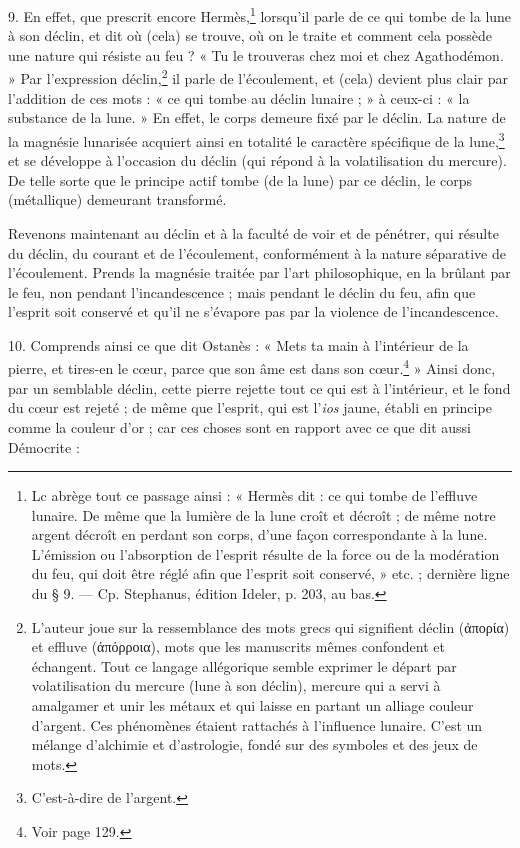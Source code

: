 \documentclass[a4paper, 11pt, oneside, polutonikogreek, french]{article}
\begin{document}
9. En effet, que prescrit encore Hermès,\footnote{Lc abrège tout ce passage ainsi : « Hermès dit : ce qui tombe de l'effluve lunaire. De même que la lumière de la lune croît et décroît ; de même notre argent décroît en perdant son corps, d'une façon correspondante à la lune. L'émission ou l'absorption de l'esprit résulte de la force ou de la modération du feu, qui doit être réglé afin que l'esprit soit conservé, » etc. ; dernière ligne du § 9. --- Cp. Stephanus, édition Ideler, p. 203, au bas.} lorsqu'il parle de ce qui tombe de la lune à son déclin, et dit où (cela) se trouve, où on le traite et comment cela possède une nature qui résiste au feu ? « Tu le trouveras chez moi et chez Agathodémon. » Par l'expression déclin,\footnote{L'auteur joue sur la ressemblance des mots grecs qui signifient déclin (ἀπορία) et effluve (ἀπόρροια), mots que les manuscrits mêmes confondent et échangent. Tout ce langage allégorique semble exprimer le départ par volatilisation du mercure (lune à son déclin), mercure qui a servi à amalgamer et unir les métaux et qui laisse en partant un alliage couleur d'argent. Ces phénomènes étaient rattachés à l'influence lunaire. C'est un mélange d'alchimie et d'astrologie, fondé sur des symboles et des jeux de mots.} il parle de l'écoulement, et (cela) devient plus clair par l'addition de ces mots : « ce qui tombe au déclin lunaire ; » à ceux-ci : « la substance de la lune. » En effet, le corps demeure fixé par le déclin. La nature de la magnésie lunarisée acquiert ainsi en totalité le caractère spécifique de la lune,\footnote{C'est-à-dire de l'argent.} et se développe à l'occasion du déclin (qui répond à la volatilisation du mercure). De telle sorte que le principe actif tombe (de la lune) par ce déclin, le corps (métallique) demeurant transformé.

Revenons maintenant au déclin et à la faculté de voir et de pénétrer, qui résulte du déclin, du courant et de l'écoulement, conformément à la nature séparative de l'écoulement. Prends la magnésie traitée par l'art philosophique, en la brûlant par le feu, non pendant l'incandescence ; mais pendant le déclin du feu, afin que l'esprit soit conservé et qu'il ne s'évapore pas par la violence de l'incandescence.

10. Comprends ainsi ce que dit Ostanès : « Mets ta main à l'intérieur de la pierre, et tires-en le cœur, parce que son âme est dans son cœur.\footnote{Voir page 129.} » Ainsi donc, par un semblable déclin, cette pierre rejette tout ce qui est à l'intérieur, et le fond du cœur est rejeté ; de même que l'esprit, qui est l'\emph{ios} jaune, établi en principe comme la couleur d'or ; car ces choses sont en rapport avec ce que dit aussi Démocrite :
\end{document}
